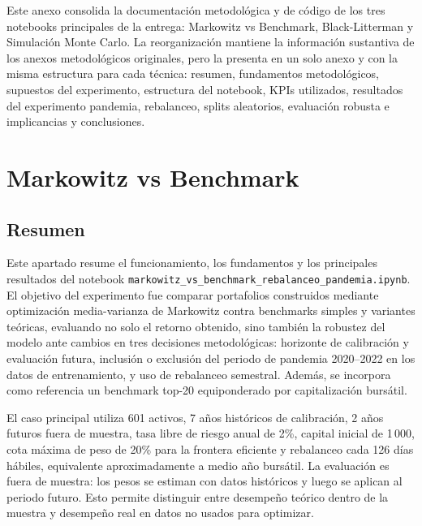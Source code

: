 Este anexo consolida la documentaci\'on metodol\'ogica y de c\'odigo de los tres
notebooks principales de la entrega: Markowitz vs Benchmark, Black-Litterman y
Simulaci\'on Monte Carlo. La reorganizaci\'on mantiene la informaci\'on sustantiva
de los anexos metodol\'ogicos originales, pero la presenta en un solo anexo y con
la misma estructura para cada t\'ecnica: resumen, fundamentos metodol\'ogicos,
supuestos del experimento, estructura del notebook, KPIs utilizados, resultados
del experimento pandemia, rebalanceo, splits aleatorios, evaluaci\'on robusta e
implicancias y conclusiones.

\section*{Markowitz vs Benchmark}

\subsection*{Resumen}

Este apartado resume el funcionamiento, los fundamentos y los principales
resultados del notebook
\texttt{markowitz\_vs\_benchmark\_rebalanceo\_pandemia.ipynb}. El objetivo del
experimento fue comparar portafolios construidos mediante optimizaci\'on
media-varianza de Markowitz contra benchmarks simples y variantes te\'oricas,
evaluando no solo el retorno obtenido, sino tambi\'en la robustez del modelo ante
cambios en tres decisiones metodol\'ogicas: horizonte de calibraci\'on y
evaluaci\'on futura, inclusi\'on o exclusi\'on del periodo de pandemia 2020--2022
en los datos de entrenamiento, y uso de rebalanceo semestral. Adem\'as, se
incorpora como referencia un benchmark top-20 equiponderado por capitalizaci\'on
burs\'atil.

El caso principal utiliza 601 activos, 7 a\~nos hist\'oricos de calibraci\'on,
2 a\~nos futuros fuera de muestra, tasa libre de riesgo anual de 2\%, capital
inicial de 1\,000, cota m\'axima de peso de 20\% para la frontera eficiente y
rebalanceo cada 126 d\'ias h\'abiles, equivalente aproximadamente a medio a\~no
burs\'atil. La evaluaci\'on es fuera de muestra: los pesos se estiman con datos
hist\'oricos y luego se aplican al periodo futuro. Esto permite distinguir entre
desempe\~no te\'orico dentro de la muestra y desempe\~no real en datos no usados
para optimizar.


